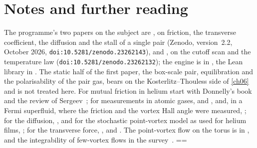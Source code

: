 \section{Notes and further reading}

The programme's two papers on the subject are \cite{Callens2026a}, on friction, the transverse coefficient, the diffusion and the stall of a single pair (Zenodo, version~2.2, October 2026, \texttt{doi:10.5281/\allowbreak zenodo.23262143}), and \cite{Callens2026b}, on the cutoff scan and the temperature law (\texttt{doi:10.5281/\allowbreak zenodo.23262132}); the engine is in \cite{Callens2026sw}, the Lean library in \cite{Callens2026lib}. The static half of the first paper, the box-scale pair, equilibration and the polarisability
of the pair gas, bears on the Kosterlitz--Thouless side of \cref{ch06} and is not treated here. For mutual friction in helium start with Donnelly's book~\cite{Donnelly1991} and the review of Sergeev~\cite{Sergeev2023}; for measurements in atomic gases, \cite{Moon2015} and \cite{Neely2024}, and, in a Fermi superfluid, where the friction and the vortex Hall angle were measured, \cite{Grani2025}; for the diffusion, \cite{Mehdi2023}, and for the stochastic point-vortex model as used
for helium films, \cite{AHNS1980}; for the transverse force, \cite{ThoulessAoNiu1996}, \cite{Iordanskii1964} and \cite{Sonin1997}. The point-vortex flow on the torus is in \cite{WeissMcWilliams1991}, and the integrability of few-vortex flows in the survey~\cite{ModinViviani2021}.
\widowpenalty=\chsevenwp\relax\clubpenalty=\chsevencp\relax
\flushbottom

